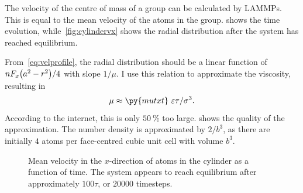 \documentclass[11pt,british,a4paper]{report}
\begin{document}
The velocity of the centre of mass of a group can be calculated by LAMMPs. This is equal to the mean velocity of the atoms in the group.  shows the time evolution, while~\vref{fig:cylindervx} shows the radial distribution after the system has reached equilibrium.


From~\vref{eq:velprofile}, the radial distribution should be a linear function of \(nF_x\qty(a^2-r^2)/4\) with slope \(1/\mu\). I use this relation to approximate the viscosity, resulting in
\begin{equation}
    \mu \approx \py{mutxt}\ \varepsilon\tau/\sigma^3. \label{eq:viscosity}
\end{equation}
According to the internet, this is only \(\SI{50}{\percent}\) too large.
 shows the quality of the approximation. The number density is approximated by \(2/b^3\), as there are initially \(4\) atoms per face-centred cubic unit cell with volume \(b^3\).
\begin{figure}[tbh]
    \centering
    \caption{Mean velocity in the \(x\)-direction of atoms in the cylinder as a function of time. The system appears to reach equilibrium after approximately \(100\tau\), or \(\num{20000}\) timesteps.}%
    \label{fig:cylindervxcm}
\end{figure}
\end{document}
